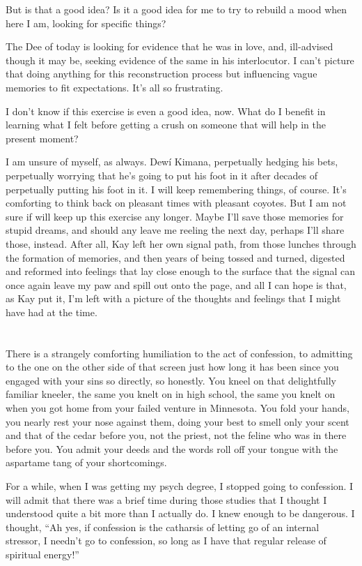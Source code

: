 But is that a good idea? Is it a good idea for me to try to rebuild a mood when here I am, looking for specific things?

The Dee of today is looking for evidence that he was in love, and, ill-advised though it may be, seeking evidence of the same in his interlocutor. I can't picture that doing anything for this reconstruction process but influencing vague memories to fit expectations. It's all so frustrating.

I don't know if this exercise is even a good idea, now. What do I benefit in learning what I felt before getting a crush on someone that will help in the present moment?

I am unsure of myself, as always. Dewí Kimana, perpetually hedging his bets, perpetually worrying that he's going to put his foot in it after decades of perpetually putting his foot in it. I will keep remembering things, of course. It's comforting to think back on pleasant times with pleasant coyotes. But I am not sure if will keep up this exercise any longer. Maybe I'll save those memories for stupid dreams, and should any leave me reeling the next day, perhaps I'll share those, instead. After all, Kay left her own signal path, from those lunches through the formation of memories, and then years of being tossed and turned, digested and reformed into feelings that lay close enough to the surface that the signal can once again leave my paw and spill out onto the page, and all I can hope is that, as Kay put it, I'm left with a picture of the thoughts and feelings that I might have had at the time.

\section{}

There is a strangely comforting humiliation to the act of confession, to admitting to the one on the other side of that screen just how long it has been since you engaged with your sins so directly, so honestly. You kneel on that delightfully familiar kneeler, the same you knelt on in high school, the same you knelt on when you got home from your failed venture in Minnesota. You fold your hands, you nearly rest your nose against them, doing your best to smell only your scent and that of the cedar before you, not the priest, not the feline who was in there before you. You admit your deeds and the words roll off your tongue with the aspartame tang of your shortcomings.

For a while, when I was getting my psych degree, I stopped going to confession. I will admit that there was a brief time during those studies that I thought I understood quite a bit more than I actually do. I knew enough to be dangerous. I thought, ``Ah yes, if confession is the catharsis of letting go of an internal stressor, I needn't go to confession, so long as I have that regular release of spiritual energy!''

